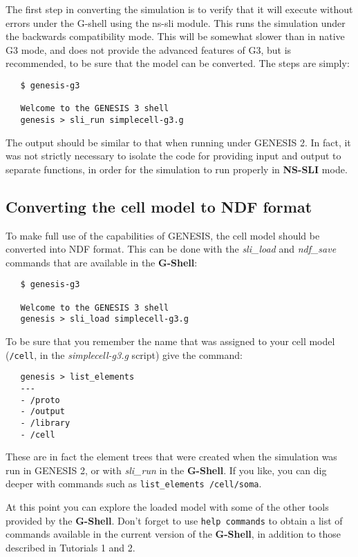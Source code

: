 \documentclass[12pt]{article}
\begin{document}
The first step in converting the simulation is to verify that
it will execute without errors under the G-shell using the ns-sli
module.  This runs the simulation under the backwards compatibility
mode.  This will be somewhat slower than in native G3 mode, and does not
provide the advanced features of G3, but is recommended, to be sure that
the model can be converted.  The steps are simply:
\begin{verbatim}
   $ genesis-g3

   Welcome to the GENESIS 3 shell
   genesis > sli_run simplecell-g3.g
\end{verbatim}
The output should be similar to that when running under GENESIS 2.  In fact,
it was not strictly necessary to isolate the code for providing input
and output to separate functions, in order for the simulation to
run properly in {\bf NS-SLI} mode.

\subsection*{Converting the cell model to NDF format}

To make full use of the capabilities of GENESIS, the cell model should
be converted into NDF format.  This can be done with the {\it sli\_load}
and {\it ndf\_save} commands that are available in the {\bf G-Shell}:
\begin{verbatim}
   $ genesis-g3

   Welcome to the GENESIS 3 shell
   genesis > sli_load simplecell-g3.g
\end{verbatim}
To be sure that you remember the name that was assigned to your cell model
({\tt /cell}, in the {\it simplecell-g3.g} script) give the command:
\begin{verbatim}
   genesis > list_elements
   ---
   - /proto
   - /output
   - /library
   - /cell
\end{verbatim}
These are in fact the element trees that were created when the simulation
was run in GENESIS 2, or with {\it sli\_run} in the {\bf G-Shell}.  If you like, you can
dig deeper with commands such as {\tt list\_elements /cell/soma}.


At this point you can explore the loaded model with some of the other tools
provided by the {\bf G-Shell}.  Don't forget to use {\tt help commands} to obtain
a list of commands available in the current version of the {\bf G-Shell}, in
addition to those described in Tutorials 1 and 2.

\end{document}
